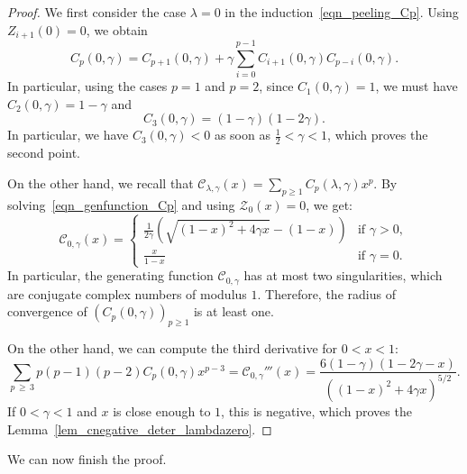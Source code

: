 \documentclass[AHL,Unicode,longabstracts,published]{cedram}
\newcommand{\clZ}{\mathcal{Z}}
\newcommand{\clC}{\mathcal{C}}
\begin{document}
\begin{proof}
We first consider the case $\lambda=0$ in the induction~\eqref{eqn_peeling_Cp}. Using $Z_{i+1}(0)=0$, we obtain
\[
C_p(0,\gamma) = C_{p+1}(0,\gamma) + \gamma \sum_{i=0}^{p-1} C_{i+1}(0, \gamma) C_{p-i}(0, \gamma).
\]
In particular, using the cases $p=1$ and $p=2$, since $C_1(0,\gamma)=1$, we must have $C_2(0,\gamma)=1-\gamma$ and
\begin{equation}\label{eqn_p_equal_to_3}
C_3(0,\gamma)=(1-\gamma)(1-2\gamma).
\end{equation}
In particular, we have $C_3(0,\gamma)<0$ as soon as $\frac{1}{2} < \gamma <1$, which proves the second point.

On the other hand, we recall that $\clC_{\lambda,\gamma}(x)=\sum_{p \geq 1} C_p(\lambda,\gamma) x^p$. By solving~\eqref{eqn_genfunction_Cp} and using $\clZ_0(x)=0$, we get:
\begin{equation}\label{eqn_gf_lambdazero_explicit}
\clC_{0,\gamma}(x)=
\begin{cases}
\frac{1}{2\gamma} \left(\sqrt{(1-x)^2+4\gamma x}-(1-x) \right) & \mbox{if }\gamma>0, \\
\frac{x}{1-x} & \mbox{if }\gamma=0.
\end{cases}
\end{equation}
In particular, the generating function $\clC_{0,\gamma}$ has at most two singularities, which are conjugate complex numbers of modulus $1$. Therefore, the radius of convergence of $\left(C_p(0,\gamma) \right)_{p \geq 1}$ is at least one.

On the other hand, we can compute the third derivative for $0<x<1$:
\[
\sum_{p\,\geq\,3} p(p-1)(p-2) C_p(0,\gamma) x^{p-3} = \clC_{0,\gamma}'''(x) = \frac{6(1-\gamma)(1-2\gamma-x)}{\left((1-x)^2+4\gamma x \right)^{5/2}}.
\]
If $0<\gamma<1$ and $x$ is close enough to $1$, this is negative, which proves the Lemma~\ref{lem_cnegative_deter_lambdazero}.
\end{proof}

We can now finish the proof.
\end{document}
